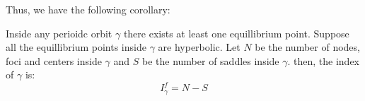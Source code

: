 Thus, we have the following corollary:

\begin{corollary}
    Inside any perioidc orbit \(\gamma \) there exists at least one equillibrium point. Suppose
    all the equillibrium points inside \(\gamma \) are hyperbolic. Let \(N\) be the number of
    nodes, foci and centers inside \(\gamma \) and \(S\) be the number of saddles inside \(\gamma \).
    then, the index of \(\gamma \) is:
    \[
        I^f_\gamma = N - S
    \] 
\end{corollary}